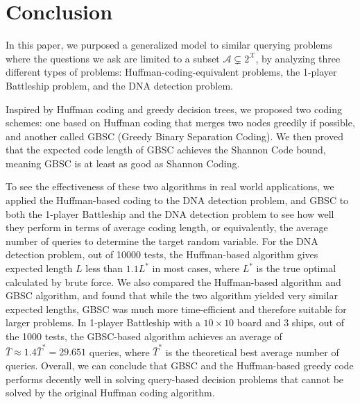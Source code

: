 
\section{Conclusion}

In this paper, we purposed a generalized model to similar querying problems where the questions we ask are limited to a subset $\mathscr{A} \subsetneq 2^\mathcal{X}$, by analyzing three different types of problems: Huffman-coding-equivalent problems, the 1-player Battleship problem, and the DNA detection problem. 

Inspired by Huffman coding and greedy decision trees, we proposed two coding schemes: one based on Huffman coding that merges two nodes greedily if possible, and another called GBSC (Greedy Binary Separation Coding). We then proved that the expected code length of GBSC achieves the Shannon Code bound, meaning GBSC is at least as good as Shannon Coding. 

To see the effectiveness of these two algorithms in real world applications, we applied the Huffman-based coding to the DNA detection problem, and GBSC to both the 1-player Battleship and the DNA detection problem to see how well they perform in terms of average coding length, or equivalently, the average number of queries to determine the target random variable. For the DNA detection problem, out of \num{10000} tests, the Huffman-based algorithm gives expected length $L$ less than $1.1L^*$ in most cases, where $L^*$ is the true optimal calculated by brute force. We also compared the Huffman-based algorithm and GBSC algorithm, and found that while the two algorithm yielded very similar expected lengths, GBSC was much more time-efficient and therefore suitable for larger problems. In 1-player Battleship with a $10\times 10$ board and 3 ships, out of the \num{1000} tests, the GBSC-based algorithm achieves an average of $\bar{T}\approx 1.4 \bar{T}^*=29.651$ queries, where $\bar{T}^*$ is the theoretical best average number of queries. Overall, we can conclude that GBSC and the Huffman-based greedy code performs decently well in solving query-based decision problems that cannot be solved by the original Huffman coding algorithm.
